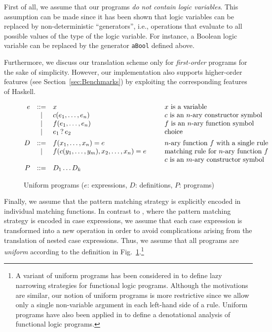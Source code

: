 \documentclass{llncs}
\newcommand{\code}[1]{\mbox{\small\texttt{#1}}}
\newcommand{\Choice}[2]{#1 \mathop{?} #2}
\begin{document}
\label{sec:no-logic-vars}
First of all, we assume that our programs
\emph{do not contain logic variables}.
This assumption can be made since it has been shown
\cite{AntoyHanus06ICLP} that logic variables can be replaced
by non-deterministic ``generators'',
i.e., operations that evaluate to all possible values of the type of
the logic variable. For instance, a Boolean logic variable
can be replaced by the generator \code{aBool} defined above.

Furthermore, we discuss our translation scheme only for \emph{first-order}
programs for the sake of simplicity.
However, our implementation also supports higher-order features
(see Section~\ref{sec:Benchmarks}) by exploiting the corresponding
features of Haskell.

\begin{figure}[t]
\[
\begin{array}{@{}rcl@{~~~~~~~~}l}
  e & ::= & x & \mbox{$x$ is a variable}\\
    &  |  & c(e_1,\ldots,e_n) & \mbox{$c$ is an $n$-ary constructor symbol}\\
    &  |  & f(e_1,\ldots,e_n) & \mbox{$f$ is an $n$-ary function symbol}\\
    &  |  & \Choice{e_1}{e_2} & \mbox{choice} \\[1ex]
  D & ::= & f(x_1,\ldots,x_n) = e
                & \mbox{$n$-ary function $f$ with a single rule}\\
    &  |  & f(c(y_1,\ldots,y_m),x_2,\ldots,x_n) = e
                & \mbox{matching rule for $n$-ary function $f$}\\
    &     & & \mbox{$c$ is an $m$-ary constructor symbol}\\
  P & ::= & D_1 \ldots D_k
\end{array}
\]
\caption{Uniform programs ($e$: expressions, $D$: definitions, $P$: programs)}
\label{fig:uniform}
\end{figure}
%
Finally, we assume that the pattern matching strategy
is explicitly encoded in individual matching functions.
In contrast to \cite{AlbertHanusHuchOliverVidal05},
where the pattern matching strategy is encoded in case expressions,
we assume that each case expression is transformed into
a new operation in order to avoid complications arising from the translation
of nested case expressions.
Thus, we assume that all programs are \emph{uniform}
according to the definition in Fig.~\ref{fig:uniform}.\footnote{%
A variant of uniform programs has been considered in
\cite{MorenoEtAl90ALP} to define lazy narrowing strategies
for functional logic programs. Although the motivations are similar,
our notion of uniform programs is more restrictive since we
allow only a single non-variable argument in each left-hand side
of a rule.
Uniform programs have also been applied in
\cite{Zartmann97SAS} to define a denotational analysis
of functional logic programs.}
\end{document}
